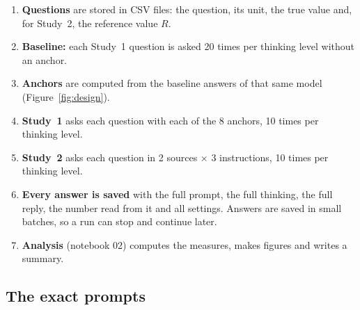\documentclass[11pt,a4paper]{article}
\begin{document}
\begin{enumerate}
  \item \textbf{Questions} are stored in CSV files: the question, its unit, the true value and, for Study~2, the reference value $R$.
  \item \textbf{Baseline:} each Study~1 question is asked 20 times per thinking level without an anchor.
  \item \textbf{Anchors} are computed from the baseline answers of that same model (Figure~\ref{fig:design}).
  \item \textbf{Study~1} asks each question with each of the 8 anchors, 10 times per thinking level.
  \item \textbf{Study~2} asks each question in 2 sources $\times$ 3 instructions, 10 times per thinking level.
  \item \textbf{Every answer is saved} with the full prompt, the full thinking, the full reply, the number read from it and all settings. Answers are saved in small batches, so a run can stop and continue later.
  \item \textbf{Analysis} (notebook 02) computes the measures, makes figures and writes a summary.
\end{enumerate}

\subsection{The exact prompts}
\end{document}
